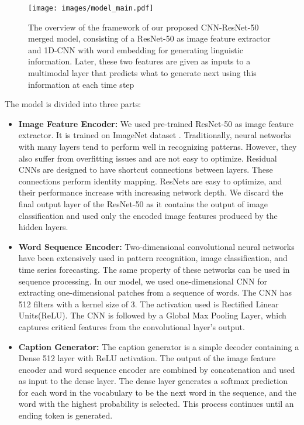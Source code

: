 \documentclass[runningheads]{llncs}
\begin{document}
\begin{figure}
\texttt{[image: images/model\_main.pdf]}
\caption{The overview of the framework of our proposed CNN-ResNet-50 merged model, consisting of a ResNet-50 as image feature extractor and 1D-CNN with word embedding for generating linguistic information. Later, these two features are given as inputs to a multimodal layer that predicts what to generate next using this information at each time step}
\label{fig1}
\end{figure}
The model is divided into three parts:
\begin{itemize}
  \item \textbf{Image Feature Encoder:} We used pre-trained ResNet-50 \cite{resnet} as image feature extractor. It is trained on ImageNet  dataset \cite{imagenet}. Traditionally, neural networks with many layers tend to perform well in recognizing patterns. However, they also suffer from overfitting issues and are not easy to optimize. Residual CNNs are designed to have shortcut connections between layers. These connections perform identity mapping. ResNets are easy to optimize, and their performance increase with increasing network depth. We discard the final output layer of the ResNet-50 as it contains the output of image classification and used only the encoded image features produced by the hidden layers.
  \item \textbf{Word Sequence Encoder:}
 Two-dimensional convolutional neural networks have been extensively used in pattern recognition, image classification, and time series forecasting. The same property of these networks can be used in sequence processing. In our model, we used one-dimensional CNN for extracting one-dimensional patches from a sequence of words. The CNN has 512 filters with a kernel size of 3. The activation used is  Rectified Linear Units(ReLU). The CNN is followed by a Global Max Pooling Layer, which captures critical features from the convolutional layer's output.
	\item \textbf{Caption Generator:} The caption generator is a simple decoder containing a Dense 512 layer with ReLU activation. The output of the image feature encoder and word sequence encoder are combined by concatenation and used as input to the dense layer. The dense layer generates a softmax prediction for each word in the vocabulary to be the next word in the sequence, and the word with the highest probability is selected. This process continues until an ending token is generated.
\end{itemize}
\end{document}
